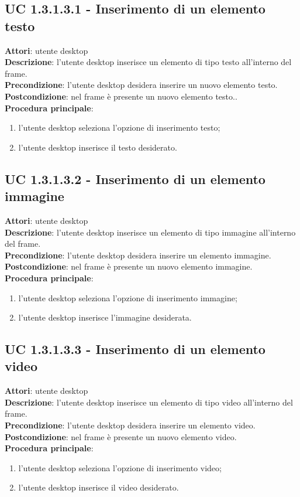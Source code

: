 \subsection{UC 1.3.1.3.1 - Inserimento di un elemento testo}{
	\label{uc1.3.1.3.1}
	\textbf{Attori}: utente desktop \\
	\textbf{Descrizione}: l'utente desktop inserisce un elemento di tipo testo all'interno del frame. \\
	\textbf{Precondizione}: l'utente desktop desidera inserire un nuovo elemento testo.	\\
	\textbf{Postcondizione}: nel frame è presente un nuovo elemento testo..	\\
	\textbf{Procedura principale}:
	\begin{enumerate}
		\item l'utente desktop seleziona l'opzione di inserimento testo;
		\item l'utente desktop inserisce il testo desiderato.
	\end{enumerate}
	}
\subsection{UC 1.3.1.3.2 - Inserimento di un elemento immagine}{
	\label{uc1.3.1.3.2}
	\textbf{Attori}: utente desktop \\
	\textbf{Descrizione}: l'utente desktop inserisce un elemento di tipo immagine all'interno del frame. \\
	\textbf{Precondizione}: l'utente desktop desidera inserire un elemento immagine.	\\
	\textbf{Postcondizione}: nel frame è presente un nuovo elemento immagine.	\\
	\textbf{Procedura principale}:
	\begin{enumerate}
		\item l'utente desktop seleziona l'opzione di inserimento immagine;
		\item l'utente desktop inserisce l'immagine desiderata.
	\end{enumerate}
	}
\subsection{UC 1.3.1.3.3 - Inserimento di un elemento video}{
	\label{uc1.3.1.3.3}
	\textbf{Attori}: utente desktop \\
	\textbf{Descrizione}: l'utente desktop inserisce un elemento di tipo video all'interno del frame. \\
	\textbf{Precondizione}: l'utente desktop desidera inserire un elemento video.	\\
	\textbf{Postcondizione}: nel frame è presente un nuovo elemento video.	\\
	\textbf{Procedura principale}:
	\begin{enumerate}
		\item l'utente desktop seleziona l'opzione di inserimento video;
		\item l'utente desktop inserisce il video desiderato.
	\end{enumerate}
	}
